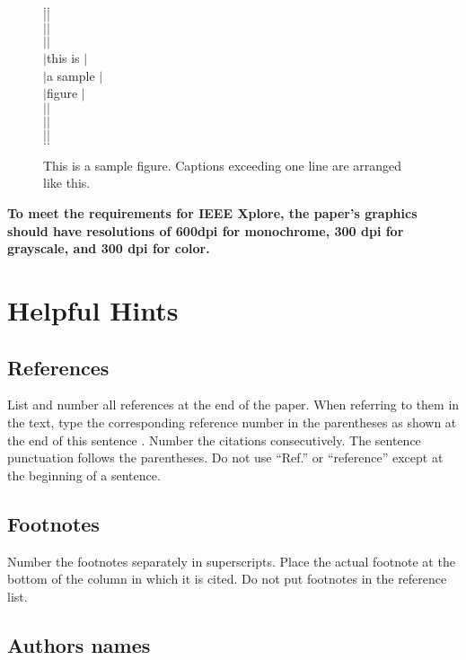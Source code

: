 \documentclass[twocolumn,letterpaper]{article}
\begin{document}
\begin{figure}[tb]
\begin{center}
\begin{minipage}{5cm}
$.$\hrulefill $.$\\$|$\hfill $|$\\$|$\hfill $|$\\$|$\hfill $|$\\
$|$\hfill this is \hfill $|$\\
$|$\hfill a sample \hfill $|$\\
$|$\hfill  figure  \hfill $|$\\
$|$\hfill $|$\\$|$\hfill $|$\\$|$\hfill $|$\\$.$\hrulefill $.$\\
\end{minipage}
\caption{This is a sample figure. Captions exceeding
one line are arranged like this.}
\end{center}
\end{figure}

\textbf{
To meet the requirements for IEEE Xplore, the paper's graphics
should have resolutions of 600dpi for monochrome, 300 dpi for 
grayscale, and 300 dpi for color.}

\section{Helpful Hints}

\subsection{References}
List and number all references at the end of the paper. When referring
to them in the text, type the corresponding reference number in the
parentheses as shown at the end of this sentence \cite{key}. Number
the citations consecutively. The sentence punctuation follows the
parentheses. Do not use ``Ref.\cite{baz}'' or
``reference\cite{baz}'' except at the beginning of a sentence.

\subsection{Footnotes}
Number the footnotes separately in superscripts. Place the actual
footnote at the bottom of the column in which it is cited. Do not put
footnotes in the reference list.

\subsection{Authors names}
\end{document}
